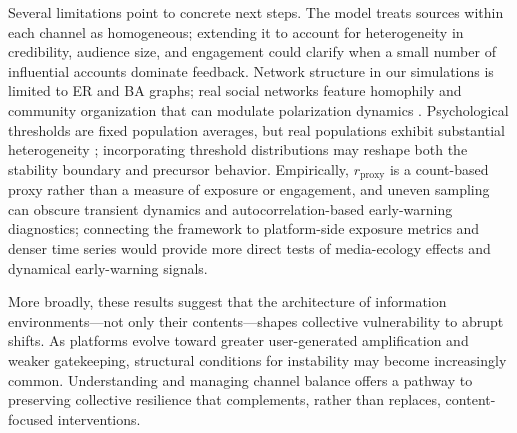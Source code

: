 \documentclass[11pt]{article}
\begin{document}
Several limitations point to concrete next steps. The model treats sources within each channel as homogeneous; extending it to account for heterogeneity in credibility, audience size, and engagement could clarify when a small number of influential accounts dominate feedback. Network structure in our simulations is limited to ER and BA graphs; real social networks feature homophily and community organization that can modulate polarization dynamics \citep{McPherson2001,Dandekar2013}. Psychological thresholds are fixed population averages, but real populations exhibit substantial heterogeneity \citep{Schwartz2013,Pfefferbaum2020}; incorporating threshold distributions may reshape both the stability boundary and precursor behavior. Empirically, $r_{\text{proxy}}$ is a count-based proxy rather than a measure of exposure or engagement, and uneven sampling can obscure transient dynamics and autocorrelation-based early-warning diagnostics; connecting the framework to platform-side exposure metrics and denser time series would provide more direct tests of media-ecology effects and dynamical early-warning signals.

More broadly, these results suggest that the architecture of information environments---not only their contents---shapes collective vulnerability to abrupt shifts. As platforms evolve toward greater user-generated amplification and weaker gatekeeping, structural conditions for instability may become increasingly common. Understanding and managing channel balance offers a pathway to preserving collective resilience that complements, rather than replaces, content-focused interventions.

\FloatBarrier


\end{document}
